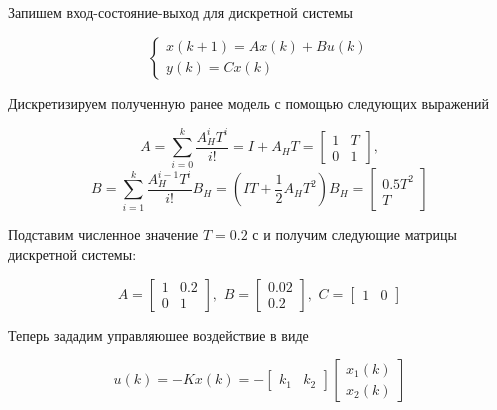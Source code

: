 Запишем вход-состояние-выход для дискретной системы

\begin{equation}
	\begin{cases}
		x(k+1) = Ax(k) + B u(k)\\
		y(k) = C x(k)
	\end{cases}
\end{equation}


Дискретизируем полученную ранее модель с помощью следующих выражений

\begin{equation}
	\label{2_disc_a}
	A = \sum \limits_{i=0}^k \frac{A^i_HT^i}{i!} = I + A_HT = \begin{bmatrix}
		1 & T\\
		0 & 1
	\end{bmatrix},
\end{equation}
\begin{equation}
	\label{2_disc_b}
	B = \sum \limits_{i=1}^k \frac{A^{i-1}_HT^i}{i!}B_H = \left( IT + \frac{1}{2} A_HT^2 \right)B_H = \begin{bmatrix}
		 0.5T^2\\
		 T
	\end{bmatrix}
\end{equation}

Подставим численное значение $T=0.2$ с и получим следующие матрицы дискретной системы:

\begin{equation}
	A = \begin{bmatrix}
		1 & 0.2\\
		0 & 1
	\end{bmatrix}, \, \, 
	B = \begin{bmatrix}
		0.02\\ 0.2
	\end{bmatrix}, \, \, 
	C = \begin{bmatrix}
		1 & 0
	\end{bmatrix}
\end{equation}


Теперь зададим управляюшее воздействие в виде

\begin{equation}
	u(k) = -Kx(k) = - \begin{bmatrix}
		k_1 & k_2
	\end{bmatrix} \begin{bmatrix}
	x_1(k)\\ x_2 (k)
	\end{bmatrix}
\end{equation}

